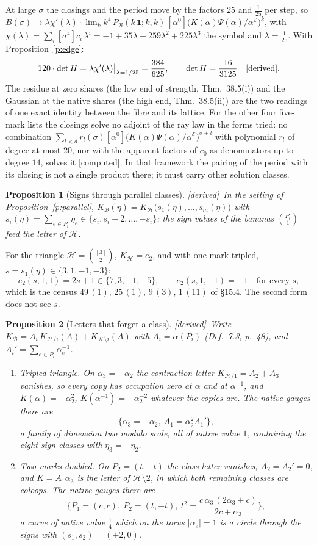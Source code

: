 \documentclass[11pt]{article}
\newcommand{\cE}{\mathcal E}
\newcommand{\cB}{\mathcal B}
\newcommand{\cH}{\mathcal H}
\newcommand{\one}{\mathbf 1}
\newcommand{\Pc}[1]{P_{\cB}(#1\,\one;#1,#1)}
\newcommand{\Clo}[1]{[\alpha^0]\big(K(\alpha)\Psi(\alpha)/\alpha^{\cE}\big)^{#1}}
\theoremstyle{plain}
\newtheorem{proposition}{Proposition}[section]
\theoremstyle{definition}
\theoremstyle{remark}
\newcommand{\derived}{\textup{[derived]}}
\newcommand{\computed}{\textup{[computed]}}
\begin{document}
At large $\sigma$ the closings and the period move by the factors $25$ and $\frac1{25}$ per step, so $B(\sigma)\to\lambda\chi'(\lambda)\cdot\lim_kk^4\,\Pc k\,\Clo k$, with $\chi(\lambda)=\sum_i[\sigma^4]c_i\,\lambda^i=-1+35\lambda-259\lambda^2+225\lambda^3$ the symbol and $\lambda=\frac1{25}$. With Proposition~\ref{p:edge}:
\[
120\cdot\det H=\lambda\chi'(\lambda)\big|_{\lambda=1/25}=\frac{384}{625},\qquad \det H=\frac{16}{3125}\quad\derived.
\]
The residue at zero shares (the low end of strength, Thm.~38.5(i)) and the Gaussian at the native shares (the high end, Thm.~38.5(ii)) are the two readings of one exact identity between the fibre and its lattice. For the other four five-mark lists the closings solve no adjoint of the ray law in the forms tried: no combination $\sum_{l<d}r_l(\sigma)\Clo{\sigma+l}$ with polynomial $r_l$ of degree at most $20$, nor with the apparent factors of $c_0$ as denominators up to degree $14$, solves it \computed. In that framework the pairing of the period with its closing is not a single product there; it must carry other solution classes.

\begin{proposition}[Signs through parallel classes]\label{p:signsparallel}\derived\
In the setting of Proposition~\ref{p:parallel}, $K_{\cB}(\eta)=K_{\cH}\big(s_1(\eta),\dots,s_m(\eta)\big)$ with $s_i(\eta)=\sum_{e\in P_i}\eta_e\in\{s_i,s_i-2,\dots,-s_i\}$: the sign values of the bananas $\binom{P_i}1$ feed the letter of $\cH$.
\end{proposition}

For the triangle $\cH=\binom{[3]}2$, $K_{\cH}=e_2$, and with one mark tripled, $s=s_1(\eta)\in\{3,1,-1,-3\}$:
\[
e_2(s,1,1)=2s+1\in\{7,3,-1,-5\},\qquad e_2(s,1,-1)=-1\quad\text{for every }s,
\]
which is the census $49\,(1),\,25\,(1),\,9\,(3),\,1\,(11)$ of \S15.4. The second form does not see $s$.

\begin{proposition}[Letters that forget a class]\label{p:families}\derived\
Write $K_{\cB}=A_i\,K_{\cH/i}(A)+K_{\cH\setminus i}(A)$ with $A_i=\alpha(P_i)$ (Def.~7.3, p.~48), and $A_i'=\sum_{e\in P_i}\alpha_e^{-1}$.
\begin{enumerate}[label=(\roman*)]
\item Tripled triangle. On $\alpha_3=-\alpha_2$ the contraction letter $K_{\cH/1}=A_2+A_3$ vanishes, so every copy has occupation zero at $\alpha$ and at $\alpha^{-1}$, and $K(\alpha)=-\alpha_2^2$, $K(\alpha^{-1})=-\alpha_2^{-2}$ whatever the copies are. The native gauges there are
\[
\big\{\alpha_3=-\alpha_2,\ A_1=\alpha_2^2A_1'\big\},
\]
a family of dimension two modulo scale, all of native value $1$, containing the eight sign classes with $\eta_3=-\eta_2$.
\item Two marks doubled. On $P_2=(t,-t)$ the class letter vanishes, $A_2=A_2'=0$, and $K=A_1\alpha_3$ is the letter of $\cH\setminus2$, in which both remaining classes are coloops. The native gauges there are
\[
\Big\{P_1=(c,c),\ P_2=(t,-t),\ t^2=\frac{c\,\alpha_3\,(2\alpha_3+c)}{2c+\alpha_3}\Big\},
\]
a curve of native value $\frac14$ which on the torus $|\alpha_e|=1$ is a circle through the signs with $(s_1,s_2)=(\pm2,0)$.
\end{enumerate}
\end{proposition}
\end{document}
